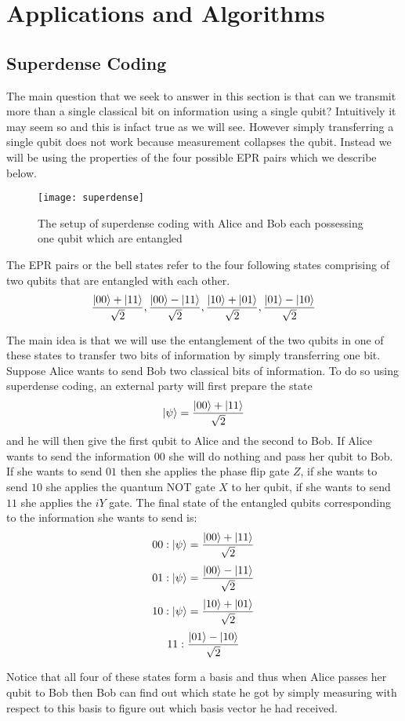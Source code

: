 \part{Applications and Algorithms}
\chapter{Superdense Coding}
The main question that we seek to answer in this section is that can we transmit more than a single classical bit on information using a single qubit? Intuitively it may seem so and this is infact true as we will see. However simply transferring a single qubit does not work because measurement collapses the qubit. Instead we will be using the properties of the four possible EPR pairs which we describe below.

\begin{figure}[htp]
    \centering
    \caption{The setup of superdense coding with Alice and Bob each possessing one qubit which are entangled}
    \texttt{[image: superdense]}
\end{figure}

The EPR pairs or the bell states refer to the four following states comprising of two qubits that are entangled with each other.
$$ \frac{\ket{00} + \ket{11}}{\sqrt{2}}, \frac{\ket{00} - \ket{11}}{\sqrt{2}}, \frac{\ket{10} + \ket{01}}{\sqrt{2}}, \frac{\ket{01} - \ket{10}}{\sqrt{2}}$$

The main idea is that we will use the entanglement of the two qubits in one of these states to transfer two bits of information by simply transferring one bit.
Suppose Alice wants to send Bob two classical bits of information. To do so using superdense coding, an external party will first prepare the state
$$ \ket{\psi} = \frac{\ket{00} + \ket{11}}{\sqrt{2}} $$
and he will then give the first qubit to Alice and the second to Bob.
If Alice wants to send the information $00$ she will do nothing and pass her qubit to Bob.
If she wants to send $01$ then she applies the phase flip gate $Z$, if she wants to send $10$ she applies the quantum NOT gate $X$ to her qubit, if she wants to send $11$ she applies the $iY$ gate. The final state of the entangled qubits corresponding to the information she wants to send is:
$$ 00: \ket{\psi} = \frac{\ket{00} + \ket{11}}{\sqrt{2}}$$
$$ 01: \ket{\psi} = \frac{\ket{00} - \ket{11}}{\sqrt{2}} $$
$$ 10: \ket{\psi} = \frac{\ket{10} + \ket{01}}{\sqrt{2}}$$
$$ 11:  \frac{\ket{01} - \ket{10}}{\sqrt{2}} $$

Notice that all four of these states form a basis and thus when Alice passes her qubit to Bob then Bob can find out which state he got by simply measuring with respect to this basis to figure out which basis vector he had received.

